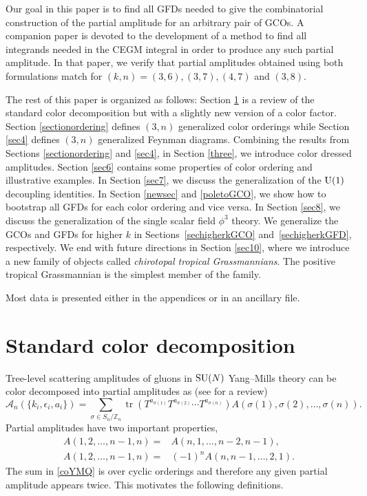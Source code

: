 \documentclass[pdftex]{sigma}
\theoremstyle{definition}
\numberwithin{equation}{section}
\begin{document}
Our goal in this paper is to find all GFDs needed to give the combinatorial construction of the partial amplitude for an arbitrary pair of GCOs. A companion paper \cite{Cachazo:2023ltw} is devoted to the development of a method to find all integrands needed in the CEGM integral in order to produce any such partial amplitude. In that paper, we verify that partial amplitudes obtained using both formulations match for $(k,n)=(3,6), (3,7), (4,7)$ and $(3,8)$.

The rest of this paper is organized as follows: Section \ref{sec2} is a review of the standard color decomposition but with a slightly new version of a color factor. Section \ref{sectionordering} defines $(3,n)$ generalized color orderings while Section \ref{sec4} defines $(3,n)$ generalized Feynman diagrams. Combining the results from Sections \ref{sectionordering} and \ref{sec4}, in Section \ref{three}, we introduce color dressed amplitudes. Section \ref{sec6} contains some properties of color ordering and illustrative examples.
In Section \ref{sec7}, we discuss the generalization of the ${\rm U}(1)$ decoupling identities. In Section \ref{newsec} and \ref{poletoGCO}, we show how to bootstrap all GFDs for each color ordering and vice versa. In
Section \ref{sec8}, we discuss the generalization of the single scalar field $\phi^3$ theory.
We generalize the GCOs and GFDs for higher $k$ in
Sections~\ref{sechigherkGCO} and~\ref{sechigherkGFD}, respectively. We end with future directions in Section \ref{sec10}, where we introduce a new family of objects called {\it chirotopal tropical Grassmannians}. The positive tropical Grassmannian is the simplest member of the family.

Most data is presented either in the appendices or in an ancillary file.

\section{Standard color decomposition}\label{sec2}

Tree-level scattering amplitudes of gluons in ${\rm SU}(N)$ Yang--Mills theory can be color decomposed into partial amplitudes as (see \cite{Mangano:1990by} for a review)
%
\begin{equation}\label{coYMQ}
 {\mathcal A}_n(\{ k_i,\epsilon_i,a_i\} ) = \sum_{\sigma \in S_{n}/{\mathbb{Z}_n}} \operatorname{tr}\left( T^{a_{\sigma (1)}}T^{a_{\sigma (2)}} \cdots T^{a_{\sigma (n)}}\right)A(\sigma(1),\sigma(2),\dots ,\sigma(n)).
\end{equation}
%
Partial amplitudes have two important properties,
%
\begin{align*}
A(1,2,\dots ,n-1, n) ={}& A(n,1,\dots ,n-2,n-1),\\
 A(1,2,\dots ,n-1,n) ={}& (-1)^n A(n,n-1,\dots ,2,1).
\end{align*}
%
The sum in \eqref{coYMQ} is over cyclic orderings and therefore any given partial amplitude appears twice. This motivates the following definitions.
\end{document}
